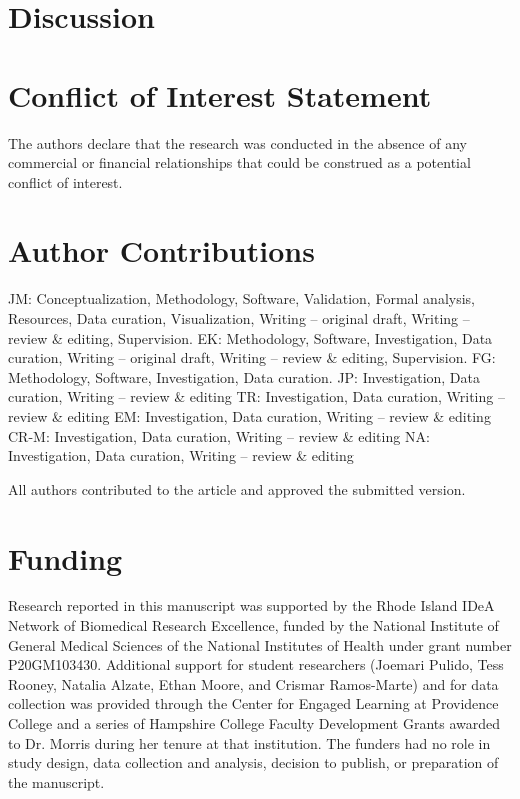 \documentclass[utf8]{FrontiersinHarvard} %
\begin{document}
	\section{Discussion}
	
	
	\section*{Conflict of Interest Statement}
	The authors declare that the research was conducted in the absence of any commercial or financial relationships that could be construed as a potential conflict of interest.
	
	\section*{Author Contributions}
	JM: Conceptualization, Methodology, Software, Validation, Formal analysis, Resources, Data curation, Visualization, Writing – original draft, Writing – review \& editing, Supervision.
	EK: Methodology, Software, Investigation, Data curation, Writing – original draft, Writing – review \& editing, Supervision.
	FG: Methodology, Software, Investigation, Data curation.
	JP: Investigation, Data curation, Writing – review \& editing
	TR: Investigation, Data curation, Writing – review \& editing
	EM: Investigation, Data curation, Writing – review \& editing
	CR-M: Investigation, Data curation, Writing – review \& editing
	NA: Investigation, Data curation, Writing – review \& editing
	
	All authors contributed to the article and approved the submitted version.
	
	\section*{Funding}
	Research reported in this manuscript was supported by the Rhode Island IDeA Network of Biomedical Research Excellence, funded by the National Institute of General Medical Sciences of the National Institutes of Health under grant number P20GM103430. Additional support for student researchers (Joemari Pulido, Tess Rooney, Natalia Alzate, Ethan Moore, and Crismar Ramos-Marte) and for data collection was provided through the Center for Engaged Learning at Providence College and a series of Hampshire College Faculty Development Grants awarded to Dr. Morris during her tenure at that institution. The funders had no role in study design, data collection and analysis, decision to publish, or preparation of the manuscript.
	
\end{document}
